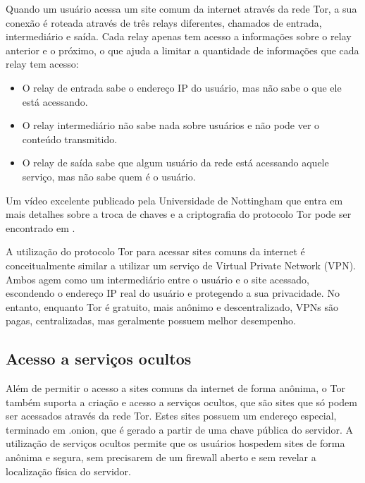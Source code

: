 Quando um usuário acessa um site comum da internet através da rede Tor, a sua conexão é roteada através de três relays diferentes, chamados de entrada, intermediário e saída. Cada relay apenas tem acesso a informações sobre o relay anterior e o próximo, o que ajuda a limitar a quantidade de informações que cada relay tem acesso:

\begin{itemize}
    \item O relay de entrada sabe o endereço IP do usuário, mas não sabe o que ele está acessando.
    \item O relay intermediário não sabe nada sobre usuários e não pode ver o conteúdo transmitido.
    \item O relay de saída sabe que algum usuário da rede está acessando aquele serviço, mas não sabe quem é o usuário.
\end{itemize}

Um vídeo excelente publicado pela Universidade de Nottingham que entra em mais detalhes sobre a troca de chaves e a criptografia do protocolo Tor pode ser encontrado em \cite{computerphile}.

A utilização do protocolo Tor para acessar sites comuns da internet é conceitualmente similar a utilizar um serviço de Virtual Private Network (VPN). Ambos agem como um intermediário entre o usuário e o site acessado, escondendo o endereço IP real do usuário e protegendo a sua privacidade. No entanto, enquanto Tor é gratuito, mais anônimo e descentralizado, VPNs são pagas, centralizadas, mas geralmente possuem melhor desempenho.

\subsection{Acesso a serviços ocultos}

Além de permitir o acesso a sites comuns da internet de forma anônima, o Tor também suporta a criação e acesso a serviços ocultos, que são sites que só podem ser acessados através da rede Tor. Estes sites possuem um endereço especial, terminado em .onion, que é gerado a partir de uma chave pública do servidor. A utilização de serviços ocultos permite que os usuários hospedem sites de forma anônima e segura, sem precisarem de um firewall aberto e sem revelar a localização física do servidor.